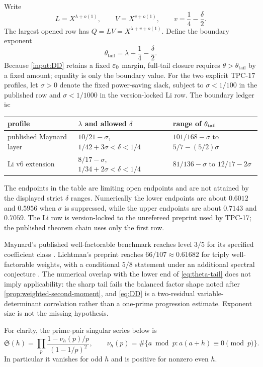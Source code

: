 Write
\[
 L=X^{\lambda+o(1)},\qquad
 V=X^{v+o(1)},\qquad
 v=\frac14-\frac\delta2.
\]
The largest opened row has $Q=LV=X^{\lambda+v+o(1)}$.  Define the
boundary exponent
\begin{equation}
 \theta_{\mathrm{tail}}=\lambda+\frac14-\frac\delta2.
 \label{eq:theta-tail}
\end{equation}
Because \cref{input:DD} retains a fixed $\varepsilon_0$ margin, full-tail
closure requires $\theta>\theta_{\mathrm{tail}}$ by a fixed amount;
equality is only the boundary value.  For the two explicit TPC-17
profiles, let $\sigma>0$ denote the fixed power-saving slack, subject
to $\sigma<1/100$ in the published row and $\sigma<1/1000$ in the
version-locked Li row.  The boundary ledger is:
\begin{center}
\begin{tabular}{@{}lll@{}}
\toprule
profile & $\lambda$ and allowed $\delta$ & range of $\theta_{\rm tail}$ \\
\midrule
published Maynard layer
& $10/21-\sigma$, $1/42+3\sigma<\delta<1/4$
& $101/168-\sigma$ to $5/7-(5/2)\sigma$ \\
Li v6 extension
& $8/17-\sigma$, $1/34+2\sigma<\delta<1/4$
& $81/136-\sigma$ to $12/17-2\sigma$ \\
\bottomrule
\end{tabular}
\end{center}
The endpoints in the table are limiting open endpoints and are not
attained by the displayed strict $\delta$ ranges.
Numerically the lower endpoints are about $0.6012$ and $0.5956$ when
$\sigma$ is suppressed, while the upper endpoints are about $0.7143$
and $0.7059$.  The Li row is version-locked to the unrefereed preprint
used by TPC-17; the published theorem chain uses only the first row.

Maynard's published well-factorable benchmark reaches level $3/5$ for
its specified coefficient class \citep{Maynard2025II}.  Lichtman's
preprint reaches $66/107\approx0.61682$ for triply well-factorable
weights, with a conditional $5/8$ statement under an additional
spectral conjecture \citep{Lichtman2023}.  The numerical overlap with
the lower end of \eqref{eq:theta-tail} does not imply applicability:
the sharp tail fails the balanced factor shape noted after
\cref{prop:weighted-second-moment}, and \eqref{eq:DD} is a two-residual
variable-determinant correlation rather than a one-prime progression
estimate.  Exponent size is not the missing hypothesis.

For clarity, the prime-pair singular series below is
\begin{equation}
 \mathfrak S(h)
 =\prod_p\frac{1-\nu_h(p)/p}{(1-1/p)^2},
 \qquad
 \nu_h(p)=\#\{a\bmod p:a(a+h)\equiv0\pmod p\}.
 \label{eq:singular-series}
\end{equation}
In particular it vanishes for odd $h$ and is positive for nonzero even
$h$.


